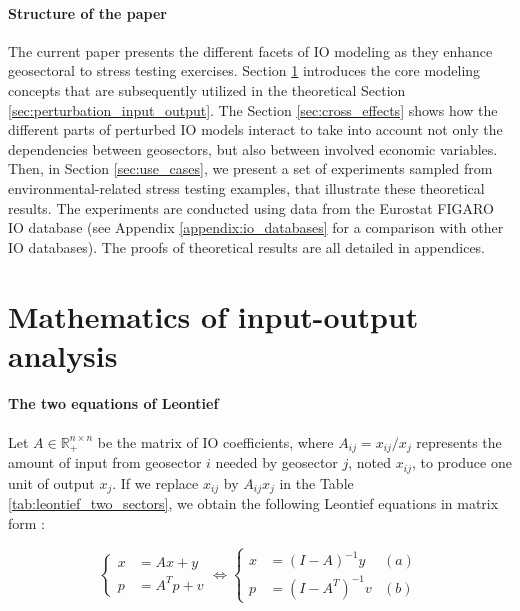 \documentclass{article}
\begin{document}
\paragraph{Structure of the paper} The current paper presents the different facets of IO modeling as they enhance geosectoral to stress testing exercises. Section \ref{sec:leontief_model} introduces the core modeling concepts that are subsequently utilized in the theoretical Section \ref{sec:perturbation_input_output}. The Section \ref{sec:cross_effects} shows how the different parts of perturbed IO models interact to take into account not only the dependencies between geosectors, but also between involved economic variables. Then, in Section \ref{sec:use_cases}, we present a set of experiments sampled from environmental-related stress testing examples, that illustrate these theoretical results. The experiments are conducted using data from the Eurostat FIGARO IO database (see Appendix \ref{appendix:io_databases} for a comparison with other IO databases). The proofs of theoretical results are all detailed in appendices. 

\section{Mathematics of input-output analysis}
\label{sec:leontief_model}

\paragraph{The two equations of Leontief} Let $A \in \mathbb{R}_+^{n\times n}$ be the matrix of IO coefficients, where $A_{ij}=x_{ij}/x_j$ represents the amount of input from geosector $i$ needed by geosector $j$, noted $x_{ij}$, to produce one unit of output $x_j$. If we replace $x_{ij}$ by $A_{ij} x_j$ in the Table \ref{tab:leontief_two_sectors}, we obtain the following Leontief equations in matrix form \cite{duchin2007mathematical}:

\begin{equation}
\label{eq:leontief_open}
    \left\{\begin{aligned} 
      x &= Ax + y \\ 
      p &= A^T p + v
    \end{aligned}\right. \iff 
    \left\{\begin{aligned}
     x &= (I-A)^{-1}y   & (a)\\ 
     p &= (I-A^T)^{-1}v  & (b)
    \end{aligned}\right.
\end{equation}
\end{document}
